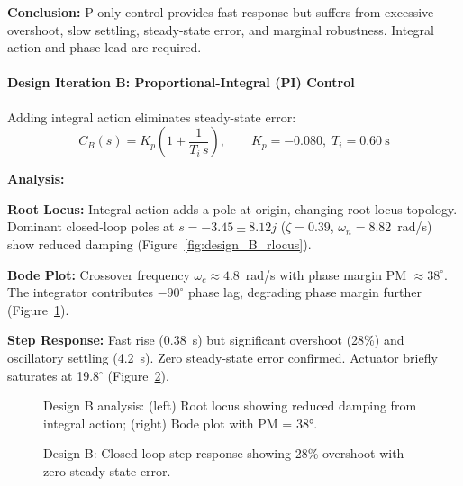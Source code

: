 \textbf{Conclusion:} P-only control provides fast response but suffers from excessive overshoot, slow settling, steady-state error, and marginal robustness. Integral action and phase lead are required.

\paragraph{Design Iteration B: Proportional-Integral (PI) Control}

Adding integral action eliminates steady-state error:
\begin{equation}
C_B(s) = K_p\left(1 + \frac{1}{T_i\,s}\right), \qquad K_p = -0.080,\; T_i = 0.60~\text{s}
\label{eq:design_B}
\end{equation}

\textbf{Analysis:}

\textbf{Root Locus:} Integral action adds a pole at origin, changing root locus topology. Dominant closed-loop poles at $s = -3.45 \pm 8.12j$ ($\zeta=0.39$, $\omega_n=8.82$~rad/s) show reduced damping (Figure~\ref{fig:design_B_rlocus}).

\textbf{Bode Plot:} Crossover frequency $\omega_c \approx 4.8$~rad/s with phase margin PM $\approx 38^\circ$. The integrator contributes $-90^\circ$ phase lag, degrading phase margin further (Figure~\ref{fig:design_B_bode}).

\textbf{Step Response:} Fast rise (0.38~s) but significant overshoot (28\%) and oscillatory settling (4.2~s). Zero steady-state error confirmed. Actuator briefly saturates at 19.8$^\circ$ (Figure~\ref{fig:design_B_step}).

\begin{figure}[h!]
\centering
\resizebox{0.48\textwidth}{!}{}
\resizebox{0.48\textwidth}{!}{}
\caption{Design B analysis: (left) Root locus showing reduced damping from integral action; (right) Bode plot with PM = 38°.}
\label{fig:design_B_rlocus}
\label{fig:design_B_bode}
\end{figure}

\begin{figure}[h!]
\centering
\resizebox{0.7\textwidth}{!}{}
\caption{Design B: Closed-loop step response showing 28\% overshoot with zero steady-state error.}
\label{fig:design_B_step}
\end{figure}

